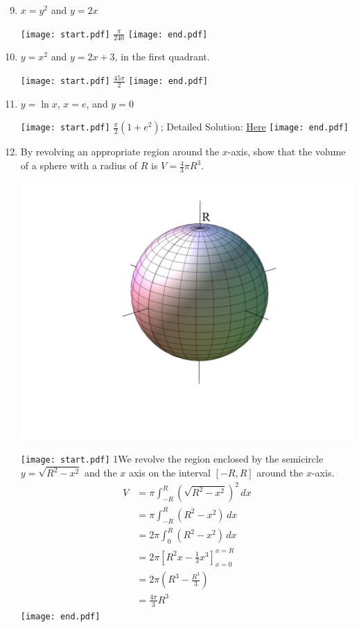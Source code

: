 \documentclass[12pt]{article}
\begin{document}

\begin{enumerate}
\setcounter{enumi}{8}

\item $x=y^2$ and $y=2x$

\texttt{[image: start.pdf]}
{{$\frac{\pi}{240}$}}
\texttt{[image: end.pdf]}


\item $y=x^2$ and $y=2x+3$, in the first quadrant.

\texttt{[image: start.pdf]}
{{$\frac{45\pi}{2}$}}
\texttt{[image: end.pdf]}


\item $y=\ln{x}$, $x=e$, and $y=0$

\texttt{[image: start.pdf]}
{{$\frac{\pi}{2}\left(1+e^2\right)$; Detailed Solution: \textcolor{blue}{\href{http://www.math.drexel.edu/classes/Calculus/resources/Math122HW/Solutions/122_08_Volume_11.pdf}{Here}}}}
\texttt{[image: end.pdf]}


\item By revolving an appropriate region around the $x$-axis, show that the volume of a sphere with a radius of $R$ is $V=\frac{4}{3}\pi R^3$.

\begin{center}
\includegraphics[scale=0.4]{sphere.pdf}
\end{center}

\texttt{[image: start.pdf]}
{{{1\linewidth}{We revolve the region enclosed by the semicircle $y=\sqrt{R^2-x^2}$ and the $x$ axis on the interval $[-R,R]$ around the $x$-axis.
\begin{align*}
V &= \pi \int_{-R}^R (\sqrt{R^2-x^2})^2 \,dx\\
&= \pi \int_{-R}^R (R^2-x^2) \,dx\\
&= 2\pi \int_{0}^R (R^2-x^2) \,dx\\
&=2\pi\left[R^2x-\frac{1}{3}x^3\right]_{x=0}^{x=R}\\
&=2\pi\left(R^3-\frac{R^3}{3}\right)\\
&=\frac{4\pi}{3}R^3
\end{align*}
}}}
\texttt{[image: end.pdf]}



\end{enumerate}
\end{document}
